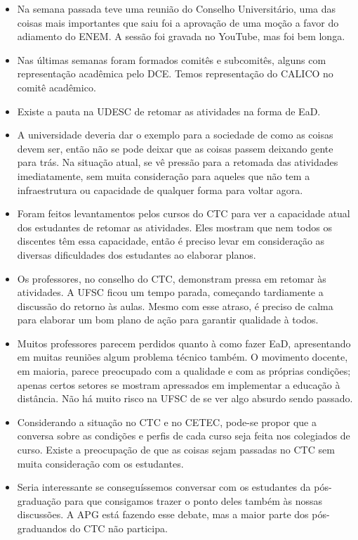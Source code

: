 \documentclass{ata-calico}
\begin{document}
\maketitle

\begin{itemize}
\item Na semana passada teve uma reunião do Conselho Universitário, uma das coisas mais importantes que saiu foi a aprovação de uma moção a favor do adiamento do ENEM. A sessão foi gravada no YouTube, mas foi bem longa.
\item Nas últimas semanas foram formados comitês e subcomitês, alguns com representação acadêmica pelo DCE. Temos representação do CALICO no comitê acadêmico.
\item Existe a pauta na UDESC de retomar as atividades na forma de EaD.
\end{itemize}

\begin{itemize}
\item A universidade deveria dar o exemplo para a sociedade de como as coisas devem ser, então não se pode deixar que as coisas passem deixando gente para trás. Na situação atual, se vê pressão para a retomada das atividades imediatamente, sem muita consideração para aqueles que não tem a infraestrutura ou capacidade de qualquer forma para voltar agora.
\item Foram feitos levantamentos pelos cursos do CTC para ver a capacidade atual dos estudantes de retomar as atividades. Eles mostram que nem todos os discentes têm essa capacidade, então é preciso levar em consideração as diversas dificuldades dos estudantes ao elaborar planos.
\item Os professores, no conselho do CTC, demonstram pressa em retomar às atividades. A UFSC ficou um tempo parada, começando tardiamente a discussão do retorno às aulas. Mesmo com esse atraso, é preciso de calma para elaborar um bom plano de ação para garantir qualidade à todos.
\item Muitos professores parecem perdidos quanto à como fazer EaD, apresentando em muitas reuniões algum problema técnico também. O movimento docente, em maioria, parece preocupado com a qualidade e com as próprias condições; apenas certos setores se mostram apressados em implementar a educação à distância. Não há muito risco na UFSC de se ver algo absurdo sendo passado.
\item Considerando a situação no CTC e no CETEC, pode-se propor que a conversa sobre as condições e perfis de cada curso seja feita nos colegiados de curso. Existe a preocupação de que as coisas sejam passadas no CTC sem muita consideração com os estudantes.
\item Seria interessante se conseguíssemos conversar com os estudantes da pós-graduação para que consigamos trazer o ponto deles também às nossas discussões. A APG está fazendo esse debate, mas a maior parte dos pós-graduandos do CTC não participa.
\end{itemize}
\end{document}
